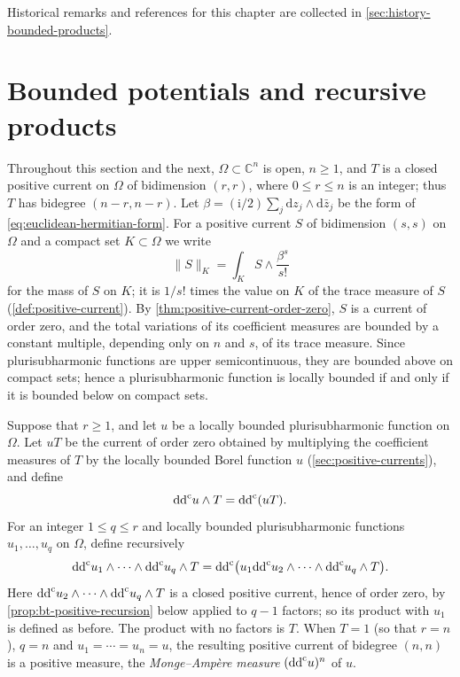 Historical remarks and references for this chapter are collected in \cref{sec:history-bounded-products}.

\section{Bounded potentials and recursive products}
\label{sec:bt-construction}

Throughout this section and the next, $\Omega\subset\mathbb{C}^n$ is open, $n\ge1$, and $T$ is a closed positive current on $\Omega$ of bidimension $(r,r)$, where $0\le r\le n$ is an integer; thus $T$ has bidegree $(n-r,n-r)$. Let $\beta=(\mathrm{i}/2)\sum_j\mathrm{d}z_j\wedge\mathrm{d}\bar z_j$ be the form of \eqref{eq:euclidean-hermitian-form}. For a positive current $S$ of bidimension $(s,s)$ on $\Omega$ and a compact set $K\subset\Omega$ we write
\[
 \|S\|_K=\int_KS\wedge\frac{\beta^s}{s!}
\]
for the mass of $S$ on $K$; it is $1/s!$ times the value on $K$ of the trace measure of $S$ (\cref{def:positive-current}). By \cref{thm:positive-current-order-zero}, $S$ is a current of order zero, and the total variations of its coefficient measures are bounded by a constant multiple, depending only on $n$ and $s$, of its trace measure. Since plurisubharmonic functions are upper semicontinuous, they are bounded above on compact sets; hence a plurisubharmonic function is locally bounded if and only if it is bounded below on compact sets.

\begin{definition}\label{def:bedford-taylor-product}
Suppose that $r\ge1$, and let $u$ be a locally bounded plurisubharmonic function on $\Omega$. Let $uT$ be the current of order zero obtained by multiplying the coefficient measures of $T$ by the locally bounded Borel function $u$ (\cref{sec:positive-currents}), and define
\[
 \mathrm{dd}^{\mathrm{c}} u\wedge T=\mathrm{dd}^{\mathrm{c}}(uT).
\]
For an integer $1\le q\le r$ and locally bounded plurisubharmonic functions $u_1,\ldots,u_q$ on $\Omega$, define recursively
\[
 \mathrm{dd}^{\mathrm{c}} u_1\wedge\cdots\wedge\mathrm{dd}^{\mathrm{c}} u_q\wedge T
 =\mathrm{dd}^{\mathrm{c}}\bigl(u_1\mathrm{dd}^{\mathrm{c}} u_2\wedge\cdots\wedge\mathrm{dd}^{\mathrm{c}} u_q\wedge T\bigr).
\]
Here $\mathrm{dd}^{\mathrm{c}} u_2\wedge\cdots\wedge\mathrm{dd}^{\mathrm{c}} u_q\wedge T$ is a closed positive current, hence of order zero, by \cref{prop:bt-positive-recursion} below applied to $q-1$ factors; so its product with $u_1$ is defined as before. The product with no factors is $T$. When $T=1$ (so that $r=n$), $q=n$ and $u_1=\cdots=u_n=u$, the resulting positive current of bidegree $(n,n)$ is a positive measure, the \emph{Monge--Amp\`ere measure} $(\mathrm{dd}^{\mathrm{c}} u)^n$ of $u$.
\end{definition}

